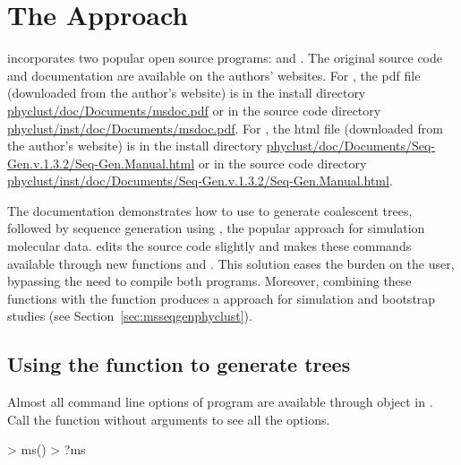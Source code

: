 \section[The ms+seqgen Approach]{The  Approach}
\label{sec:msseqgen}

 incorporates two popular open source  programs:
 \citep{Hudson2002} and  \citep{Rambaut1997}.
The original source code and documentation are available on the authors'
websites.
For ,
the pdf file (downloaded from the author's website) is in the install directory
\url{phyclust/doc/Documents/msdoc.pdf} or in the source code directory
\url{phyclust/inst/doc/Documents/msdoc.pdf}.
For ,
the html file (downloaded from the author's website) is in the install directory
\url{phyclust/doc/Documents/Seq-Gen.v.1.3.2/Seq-Gen.Manual.html}
or in the source code directory
\url{phyclust/inst/doc/Documents/Seq-Gen.v.1.3.2/Seq-Gen.Manual.html}.

The  documentation demonstrates how to use 
to generate coalescent trees, followed by sequence generation using ,
the popular  approach for simulation molecular data.
 edits the source code slightly and makes these commands available through new  functions  and .
This solution eases the burden on the user, bypassing the need to compile both programs.
Moreover, combining these functions with the  function produces a
 approach 
 for simulation and bootstrap studies (see Section~\ref{sec:msseqgenphyclust}).




\subsection[Using the ms() function to generate trees]{Using the  function to generate trees}
\label{sec:ms}

Almost all command line options of program  are available
through object  in .
Call the function without arguments to see all the options.
\begin{Code}
> ms()
> ?ms
\end{Code}

